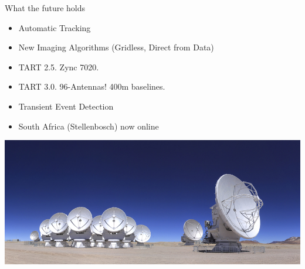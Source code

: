 \documentclass[ignorenonframetext]{beamer}
\begin{document}
% 
% 



\begin{frame}{What the future holds}
\begin{itemize}
 \item Automatic Tracking
 \item New Imaging Algorithms (Gridless, Direct from Data)
 \item TART 2.5. Zync 7020.
 \item TART 3.0. 96-Antennas! 400m baselines.
 \item Transient Event Detection
 \item South Africa (Stellenbosch) now online
\end{itemize}
\includegraphics[width=\linewidth]{fig/alma.jpg}
 
\end{frame}
\end{document}
